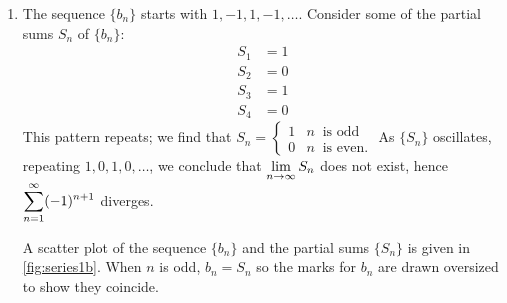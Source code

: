 \begin{example}
\begin{enumerate}
A scatter plot of the sequences $\{a_n\}$ and $\{S_n\}$ is given in \autoref{fig:series1a}. The terms of $\{a_n\}$ are growing, so the terms of the partial sums $\{S_n\}$ are growing even faster, illustrating that the series diverges.

\item	The sequence $\{b_n\}$ starts with $1, -1, 1, -1, \dotsc$. Consider some of the partial sums $S_n$ of $\{b_n\}$:
\begin{align*}
S_1 &= 1\\
S_2 &= 0\\
S_3 &= 1\\
S_4 &= 0
\end{align*}
This pattern repeats; we find that
$S_n = \begin{cases}
1  & n\ \text{ is odd}\\
0  & n\ \text{ is even.}
\end{cases}$ \smallskip
As $\{S_n\}$ oscillates, repeating $1, 0, 1, 0, \dotsc$, we conclude that $\displaystyle\lim_{n\to\infty}S_n$ does not exist, hence $\displaystyle\sum_{n=1}^\infty (-1)^{n+1}$ diverges.		


A scatter plot of the sequence $\{b_n\}$ and the partial sums $\{S_n\}$ is given in \autoref{fig:series1b}. When $n$ is odd, $b_n = S_n$ so the marks for $b_n$ are drawn oversized to show they coincide.
\end{enumerate}
\end{example}

